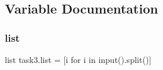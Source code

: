 \subsection{Variable Documentation}
\mbox{\label{namespacetask3_a10c3530aba7287111f528047cf12d9e0}} 
\subsubsection{\texorpdfstring{list}{list}}
{\footnotesize\ttfamily list task3.\+list = \mbox{[}i for i in input().split()\mbox{]}}

